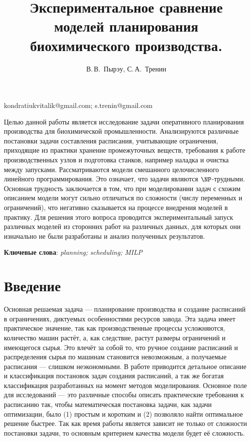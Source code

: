 \documentclass[12pt, twoside]{article}
\theoremstyle{definition}
\begin{document}
\title
    [Экспериментальное сравнение моделей планирования биохимического производства.] %
    {Экспериментальное сравнение моделей планирования биохимического производства.}
\author
    [В.\,В.~Пырэу, С.\,А.~Тренин] %
    {В.\,В.~Пырэу, С.\,А.~Тренин} %
\email
    {kondratiukvitalik@gmail.com; s.trenin@gmail.com}
\abstract
    {Целью данной работы является исследование задачи оперативного планирования производства для биохимической промышленности. Анализируются различные постановки задачи составления расписания, учитывающие ограничения, приходящие из практики хранение промежуточных веществ, требования к работе производственных узлов и подготовка станков, например наладка и очистка между запусками. Рассматриваются модели смешанного целочисленного линейного программирования. Это означает, что задачи являются $\NP$-трудными. Основная трудность заключается в том, что при моделировании задач с схожим описанием модели могут сильно отличаться по сложности (числу переменных и ограничений), что негативно сказывается на процессе внедрения моделей в практику. Для решения этого вопроса проводится экспериментальный запуск различных моделей из сторонних работ на различных данных, для которых они изначально не были разработаны и анализ полученных результатов.
    
    
\bigskip
\noindent
\textbf{Ключевые слова}: \emph {planning; scheduling; MILP}
}

\doi{}
\receivedRus{}
\receivedEng{}

\maketitle
\linenumbers

\section{Введение}
Основная решаемая задача --- планирование производства и создание расписаний в ограничениях, диктуемых особенностями ресурсов завода. Эта задача имеет практическое значение, так как производственные процессы усложняются, количество машин растёт, а, как следствие, растут размеры ограничений и имеющегося сырья. Это влечёт за собой то, что ручное создание расписаний и распределения сырья по машинам становится невозможным, а получаемые расписания --- слишком неэкономными. В работе \cite{reallife} приводится детальное описание и классификация постановок задач создания расписаний, а так же богатая классификация разработанных на момент методов моделирования. Основное поле для исследований --- это различные способы описать практические требования к расписанию так, чтобы математическая постановка задачи, как задачи оптимизации, было (1) простым и коротким и (2) позволяло найти оптимальное решение быстрее. Так как время работы является зависит не только от сложности постановки задачи, то основным критерием качества модели будет её сложность.
\end{document}
